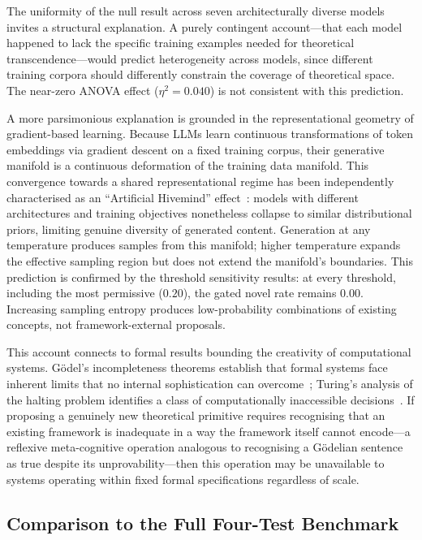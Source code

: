 \documentclass[pdflatex,sn-mathphys-num]{sn-jnl}
\begin{document}
The uniformity of the null result across seven architecturally diverse models
invites a structural explanation.  A purely contingent account---that each model
happened to lack the specific training examples needed for theoretical
transcendence---would predict heterogeneity across models, since different
training corpora should differently constrain the coverage of theoretical space.
The near-zero ANOVA effect ($\eta^2=0.040$) is not consistent with this
prediction.

A more parsimonious explanation is grounded in the representational geometry of
gradient-based learning.  Because LLMs learn continuous transformations of
token embeddings via gradient descent on a fixed training corpus, their
generative manifold is a continuous deformation of the training data manifold.
This convergence towards a shared representational regime has been independently
characterised as an ``Artificial Hivemind'' effect~\cite{tu2026prism}: models
with different architectures and training objectives nonetheless collapse to
similar distributional priors, limiting genuine diversity of generated content.
Generation at any temperature produces samples from this manifold; higher
temperature expands the effective sampling region but does not extend the
manifold's boundaries.  This prediction is confirmed by the threshold sensitivity
results: at every threshold, including the most permissive ($0.20$), the gated
novel rate remains $0.00$.  Increasing sampling entropy produces low-probability
combinations of existing concepts, not framework-external proposals.

This account connects to formal results bounding the creativity of computational
systems.  G\"{o}del's incompleteness theorems establish that formal systems face
inherent limits that no internal sophistication can
overcome~\cite{godel1931formal}; Turing's analysis of the halting problem
identifies a class of computationally inaccessible decisions~\cite{turing1936computable}.
If proposing a genuinely new theoretical primitive requires recognising that an
existing framework is inadequate in a way the framework itself cannot encode---a
reflexive meta-cognitive operation analogous to recognising a G\"{o}delian
sentence as true despite its unprovability---then this operation may be
unavailable to systems operating within fixed formal specifications regardless
of scale.

\subsection{Comparison to the Full Four-Test Benchmark}
\end{document}
